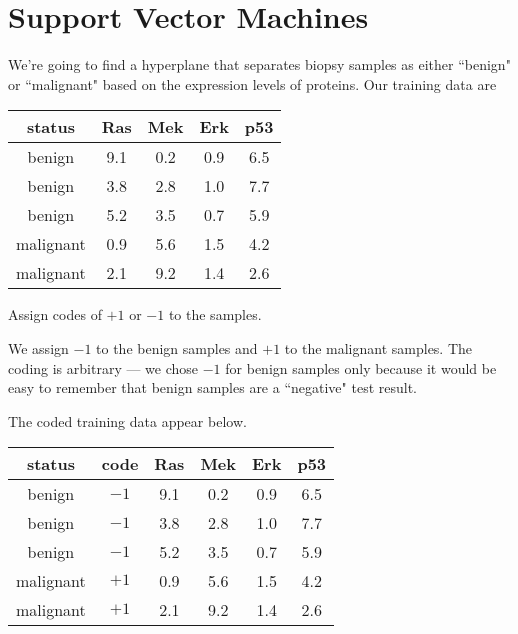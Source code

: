 \documentclass[12pt]{pajarticle}
\begin{document}

\section*{Support Vector Machines}

We're going to find a hyperplane that separates biopsy samples as either ``benign" or ``malignant" based on the expression levels of proteins. Our training data are


\begin{center}
\begin{tabular}{c|cccc}
status    & Ras & Mek & Erk & p53 \\
\hline
benign    & 9.1 & 0.2 & 0.9 & 6.5 \\
benign    & 3.8 & 2.8 & 1.0 & 7.7 \\
benign    & 5.2 & 3.5 & 0.7 & 5.9 \\
malignant & 0.9 & 5.6 & 1.5 & 4.2 \\
malignant & 2.1 & 9.2 & 1.4 & 2.6
\end{tabular}
\end{center}

\begin{question}{1}{Assign codes of $+1$ or $-1$ to the samples.}{
We assign $-1$ to the benign samples and $+1$ to the malignant samples. The coding is arbitrary --- we chose $-1$ for benign samples only because it would be easy to remember that benign samples are a ``negative" test result.

The coded training data appear below.

\begin{center}
\begin{tabular}{cc|cccc}
status    & code & Ras & Mek & Erk & p53 \\
\hline
benign    & $-1$ & 9.1 & 0.2 & 0.9 & 6.5 \\
benign    & $-1$ & 3.8 & 2.8 & 1.0 & 7.7 \\
benign    & $-1$ & 5.2 & 3.5 & 0.7 & 5.9 \\
malignant & $+1$ & 0.9 & 5.6 & 1.5 & 4.2 \\
malignant & $+1$ & 2.1 & 9.2 & 1.4 & 2.6
\end{tabular}
\end{center}

}
\end{question}
\end{document}
